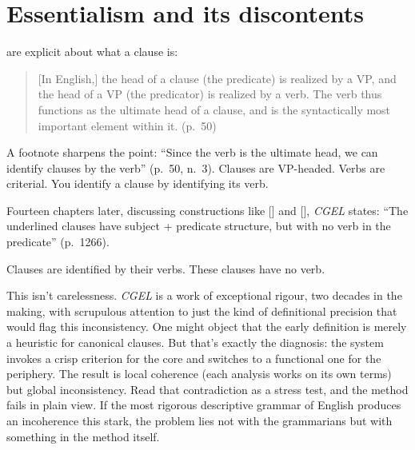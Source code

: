 \chapter{Essentialism and its discontents}
\label{ch:essentialism}

\textcite{huddleston2002} are explicit about what a clause is:

\begin{quote}
[In English,] the head of a clause (the predicate) is realized by a VP, and the head of a VP (the predicator) is realized by a verb. The verb thus functions as the ultimate head of a clause, and is the syntactically most important element within it. (p.~50)
\end{quote}

\noindent A footnote sharpens the point: \enquote{Since the verb is the ultimate head, we can identify clauses by the verb} (p.~50, n.~3). Clauses are VP-headed. Verbs are criterial. You identify a clause by identifying its verb.

Fourteen chapters later, discussing constructions like  [] and [], \textit{CGEL} states: \enquote{The underlined clauses have subject + predicate structure, but with no verb in the predicate} (p.~1266).

Clauses are identified by their verbs. These clauses have no verb.

This isn't carelessness. \textit{CGEL} is a work of exceptional rigour, two decades in the making, with scrupulous attention to just the kind of definitional precision that would flag this inconsistency. One might object that the early definition is merely a heuristic for canonical clauses. But that's exactly the diagnosis: the system invokes a crisp criterion for the core and switches to a functional one for the periphery. The result is local coherence (each analysis works on its own terms) but global inconsistency. Read that contradiction as a stress test, and the method fails in plain view. If the most rigorous descriptive grammar of English produces an incoherence this stark, the problem lies not with the grammarians but with something in the method itself.

